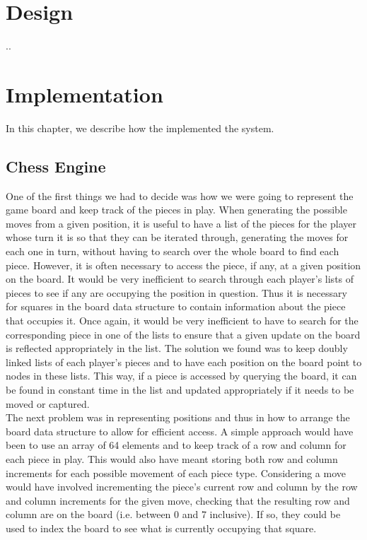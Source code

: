 \documentclass{l3proj}
\begin{document}
\chapter{Design}
\label{design}

..

\chapter{Implementation}
\label{impl}

In this chapter, we describe how the implemented the system.

\section{Chess Engine}

One of the first things we had to decide was how we were going to represent the game board and keep track of the pieces in play. When generating the possible moves from a given position, it is useful to have a list of the pieces for the player whose turn it is so that they can be iterated through, generating the moves for each one in turn, without having to search over the whole board to find each piece. However, it is often necessary to access the piece, if any, at a given position on the board. It would be very inefficient to search through each player’s lists of pieces to see if any are occupying the position in question. Thus it is necessary for squares in the board data structure to contain information about the piece that occupies it. Once again, it would be very inefficient to have to search for the corresponding piece in one of the lists to ensure that a given update on the board is reflected appropriately in the list. The solution we found was to keep doubly linked lists of each player’s pieces and to have each position on the board point to nodes in these lists. This way, if a piece is accessed by querying the board, it can be found in constant time in the list and updated appropriately if it needs to be moved or captured. \\

The next problem was in representing positions and thus in how to arrange the board data structure to allow for efficient access.  A simple approach would have been to use an array of 64 elements and to keep track of a row and column for each piece in play. This would also have meant storing both row and column increments for each possible movement of each piece type. Considering a move would have involved incrementing the piece’s current row and column by the row and column increments for the given move, checking that the resulting row and column are on the board (i.e. between 0 and 7 inclusive). If so, they could be used to index the board to see what is currently occupying that square.\\
\end{document}

